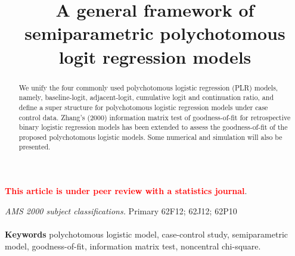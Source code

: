 \documentclass[12]{interact}
\theoremstyle{plain}%
\theoremstyle{definition}
\theoremstyle{remark}
\begin{document}
	
	
	
	\title{A general framework of semiparametric polychotomous logit regression models}
	
	\author{
	}
	
	
	\maketitle
	
	\vspace{5mm}
	\noindent\textbf{\textcolor{red}{This article is under peer review with a statistics journal}}.
	\vspace{5mm}
	
	
	
	\tableofcontents
	\vspace{15mm}
\newpage

\begin{abstract}
We unify the four commonly used polychotomous logistic regression (PLR) models, namely,
baseline-logit, adjacent-logit, cumulative logit and continuation ratio,
and define a super structure for polychotomous logistic regression models
under case control data. Zhang's (2000) information matrix test of goodness-of-fit
for retrospective binary logistic regression models has been extended
to assess the goodness-of-fit of the proposed polychotomous logistic models.
Some numerical and simulation will also be presented.\\
\end{abstract}
{\em AMS 2000 subject classifications.} Primary 62F12; 62J12; 62P10
\\
\\
\textbf{Keywords} {polychotomous logistic model, case-control study,
semiparametric model, goodness-of-fit, information matrix test, noncentral chi-square.  }
\end{document}
